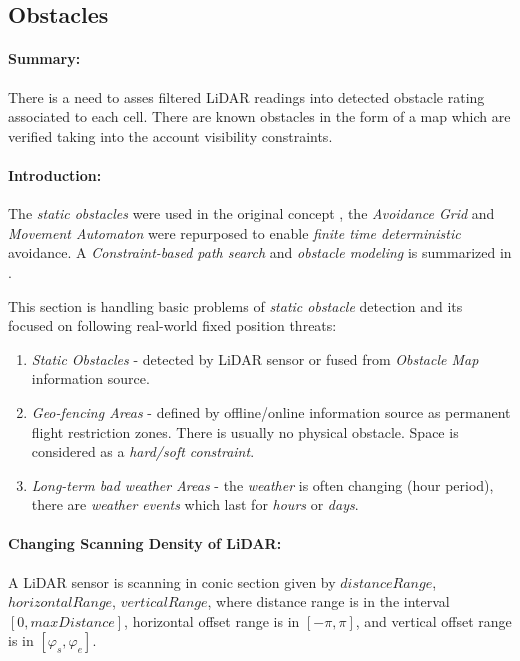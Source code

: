 \subsection{Obstacles}\label{s:staticObstacles}
 
\paragraph{Summary:} There is a need to asses filtered LiDAR readings into detected obstacle rating associated to each cell. There are known obstacles in the form of a map which are verified taking into the account visibility constraints.
    
\paragraph{Introduction:} The \emph{static obstacles} were used in the original concept \cite{gomola2017probabilistic}, the \emph{Avoidance Grid} and \emph{Movement Automaton} were repurposed to enable \emph{finite time deterministic} avoidance. A \emph{Constraint-based path search} and \emph{obstacle modeling} is summarized in \cite{hentenryck2009constraint}.

This section is handling basic problems of \emph{static obstacle} detection and its focused on following real-world fixed position threats:
\begin{enumerate}
    \item \emph{Static Obstacles} - detected by LiDAR sensor or fused from \emph{Obstacle Map} information source.
    
    \item \emph{Geo-fencing Areas} - defined by offline/online information source as permanent flight restriction zones. There is usually no physical obstacle. Space is considered as a \emph{hard/soft constraint}.
    
    \item \emph{Long-term bad weather Areas} - the \emph{weather} is often changing (hour period), there are \emph{weather events}  which last for \emph{hours} or \emph{days}.
\end{enumerate}


\paragraph{Changing Scanning Density of LiDAR:} A LiDAR sensor is scanning in conic section given by $distance Range$, $horizontal Range$, $vertical Range$, where distance range is in the interval $[0,maxDistance]$, horizontal offset range is in $[-\pi,\pi]$, and vertical offset range is in $[\varphi_s, \varphi_e]$.  


